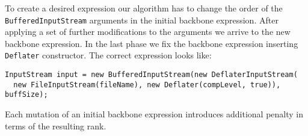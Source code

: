 To create a desired expression our algorithm has to change the order of
the \lstinline{BufferedInputStream} arguments in the initial backbone expression.
After applying a set of further modifications to the arguments we arrive to 
the new backbone expression. In the last phase we fix the backbone expression
inserting \lstinline{Deflater} constructor. The correct expression looks like:
\begin{lstlisting}    
InputStream input = new BufferedInputStream(new DeflaterInputStream(
  new FileInputStream(fileName), new Deflater(compLevel, true)), buffSize);
\end{lstlisting}
Each mutation of an initial backbone expression introduces additional penalty 
in terms of the resulting rank.
%
